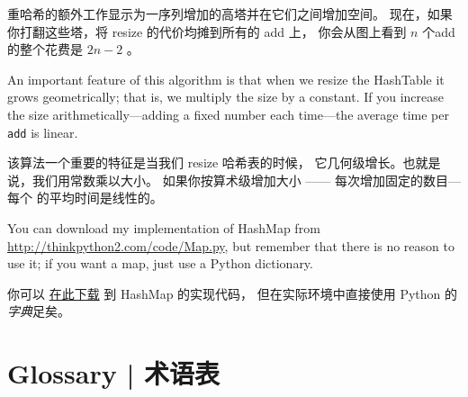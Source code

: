 重哈希的额外工作显示为一序列增加的高塔并在它们之间增加空间。
现在，如果你打翻这些塔，将 resize 的代价均摊到所有的 add 上，
你会从图上看到 $n$ 个add的整个花费是 $2n - 2$ 。

An important feature of this algorithm is that when we resize the
HashTable it grows geometrically; that is, we multiply the size by a
constant.  If you increase the size
arithmetically---adding a fixed number each time---the average time
per {\tt add} is linear.

该算法一个重要的特征是当我们 resize 哈希表的时候，
它几何级增长。也就是说，我们用常数乘以大小。
如果你按算术级增加大小 —— 每次增加固定的数目—每个  的平均时间是线性的。

You can download my implementation of HashMap from
\url{http://thinkpython2.com/code/Map.py}, but remember that there
is no reason to use it; if you want a map, just use a Python dictionary.

你可以 \href{http://thinkpython2.com/code/Map.py}{在此下载} 到 HashMap 的实现代码， 但在实际环境中直接使用 Python 的{\em 字典}足矣。

\section{Glossary  |  术语表}

